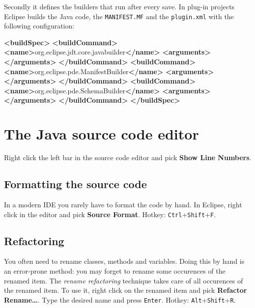 \documentclass[]{report}
\newenvironment{Shaded}{}{}
\newcommand{\KeywordTok}[1]{\textcolor[rgb]{0.00,0.44,0.13}{\textbf{{#1}}}}
\newcommand{\NormalTok}[1]{{#1}}
\begin{document}
Secondly it defines the builders that run after every save. In plug-in
projects Eclipse builds the Java code, the \texttt{MANIFEST.MF} and the
\texttt{plugin.xml} with the following configuration:

\begin{Shaded}
\begin{Highlighting}[]
\KeywordTok{<buildSpec>}
  \KeywordTok{<buildCommand>}
    \KeywordTok{<name>}\NormalTok{org.eclipse.jdt.core.javabuilder}\KeywordTok{</name>}
    \KeywordTok{<arguments>}
    \KeywordTok{</arguments>}
  \KeywordTok{</buildCommand>}
  \KeywordTok{<buildCommand>}
    \KeywordTok{<name>}\NormalTok{org.eclipse.pde.ManifestBuilder}\KeywordTok{</name>}
    \KeywordTok{<arguments>}
    \KeywordTok{</arguments>}
  \KeywordTok{</buildCommand>}
  \KeywordTok{<buildCommand>}
    \KeywordTok{<name>}\NormalTok{org.eclipse.pde.SchemaBuilder}\KeywordTok{</name>}
    \KeywordTok{<arguments>}
    \KeywordTok{</arguments>}
  \KeywordTok{</buildCommand>}
\KeywordTok{</buildSpec>}
\end{Highlighting}
\end{Shaded}

\section{The Java source code editor}

Right click the left bar in the source code editor and pick \textbf{Show
Line Numbers}.

\subsection{Formatting the source code}

In a modern IDE you rarely have to format the code by hand. In Eclipse,
right click in the editor and pick \textbf{Source \textbar{} Format}.
Hotkey: \texttt{Ctrl}+\texttt{Shift}+\texttt{F}.

\subsection{Refactoring}

You often need to rename classes, methods and variables. Doing this by
hand is an error-prone method: you may forget to rename some occurences
of the renamed item. The \emph{rename refactoring} technique takes care
of all occurences of the renamed item. To use it, right click on the
renamed item and pick \textbf{Refactor \textbar{} Rename\ldots{}}. Type
the desired name and press \texttt{Enter}. Hotkey:
\texttt{Alt}+\texttt{Shift}+\texttt{R}.
\end{document}
